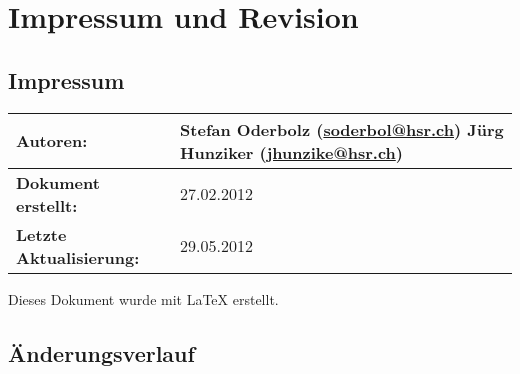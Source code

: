 \chapter*{Impressum und Revision}

\section*{Impressum}
\begin{table}[H] 
\centering 
\begin{tabular}{|p{0.35\twocelltabwidth}|p{0.65\twocelltabwidth}|}
\hline 
\textbf{Autoren:} & Stefan Oderbolz (\url{soderbol@hsr.ch}) \newline
Jürg Hunziker (\url{jhunzike@hsr.ch}) \\ 
\hline 
\textbf{Dokument erstellt:} & 27.02.2012 \\ 
\hline 
\textbf{Letzte Aktualisierung:} & 29.05.2012 \\ 
\hline 
\end{tabular}
\end{table}

Dieses Dokument wurde mit \LaTeX{} erstellt.

\section*{Änderungsverlauf}

